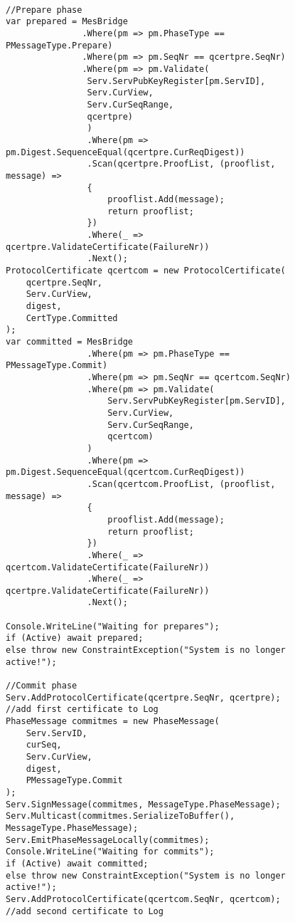 \begin{figure}[H]
	\centering
	\begin{lstlisting}[label = code:PrepareAndCommit, caption= Prepare and Commit phase, captionpos = b, basicstyle=\scriptsize]
	
//Prepare phase
var prepared = MesBridge
               .Where(pm => pm.PhaseType == PMessageType.Prepare)
               .Where(pm => pm.SeqNr == qcertpre.SeqNr)
               .Where(pm => pm.Validate(
                Serv.ServPubKeyRegister[pm.ServID], 
                Serv.CurView, 
                Serv.CurSeqRange, 
                qcertpre)
                )
                .Where(pm => pm.Digest.SequenceEqual(qcertpre.CurReqDigest))
                .Scan(qcertpre.ProofList, (prooflist, message) =>
                {
                    prooflist.Add(message);
                    return prooflist;
                })
                .Where(_ => qcertpre.ValidateCertificate(FailureNr))
                .Next();
ProtocolCertificate qcertcom = new ProtocolCertificate(
    qcertpre.SeqNr, 
    Serv.CurView, 
    digest, 
    CertType.Committed
);   
var committed = MesBridge
                .Where(pm => pm.PhaseType == PMessageType.Commit)
                .Where(pm => pm.SeqNr == qcertcom.SeqNr)
                .Where(pm => pm.Validate(
                    Serv.ServPubKeyRegister[pm.ServID], 
                    Serv.CurView, 
                    Serv.CurSeqRange, 
                    qcertcom)
                )
                .Where(pm => pm.Digest.SequenceEqual(qcertcom.CurReqDigest))
                .Scan(qcertcom.ProofList, (prooflist, message) =>
                {
                    prooflist.Add(message);
                    return prooflist;
                })
                .Where(_ => qcertcom.ValidateCertificate(FailureNr))
                .Where(_ => qcertpre.ValidateCertificate(FailureNr))
                .Next();
                
Console.WriteLine("Waiting for prepares");
if (Active) await prepared;
else throw new ConstraintException("System is no longer active!");
                
//Commit phase
Serv.AddProtocolCertificate(qcertpre.SeqNr, qcertpre); //add first certificate to Log
PhaseMessage commitmes = new PhaseMessage(
    Serv.ServID, 
    curSeq, 
    Serv.CurView, 
   	digest, 
    PMessageType.Commit
);
Serv.SignMessage(commitmes, MessageType.PhaseMessage);
Serv.Multicast(commitmes.SerializeToBuffer(), MessageType.PhaseMessage);
Serv.EmitPhaseMessageLocally(commitmes);
Console.WriteLine("Waiting for commits");
if (Active) await committed;
else throw new ConstraintException("System is no longer active!");
Serv.AddProtocolCertificate(qcertcom.SeqNr, qcertcom); //add second certificate to Log
	\end{lstlisting}
\end{figure}

